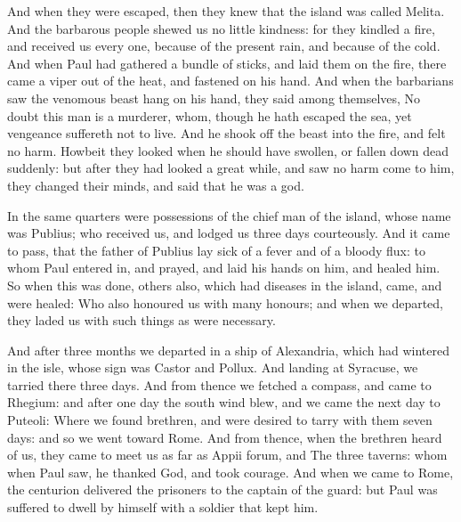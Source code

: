  And when they were escaped, then they knew that the island
was called Melita.  And the barbarous people shewed us no
little kindness: for they kindled a fire, and received us every one,
because of the present rain, and because of the cold.  And
when Paul had gathered a bundle of sticks, and laid them on the fire,
there came a viper out of the heat, and fastened on his hand.
 And when the barbarians saw the venomous beast hang on his
hand, they said among themselves, No doubt this man is a murderer, whom,
though he hath escaped the sea, yet vengeance suffereth not to live.
 And he shook off the beast into the fire, and felt no harm.
 Howbeit they looked when he should have swollen, or fallen
down dead suddenly: but after they had looked a great while, and saw no
harm come to him, they changed their minds, and said that he was a god.

 In the same quarters were possessions of the chief man of
the island, whose name was Publius; who received us, and lodged us three
days courteously.  And it came to pass, that the father of
Publius lay sick of a fever and of a bloody flux: to whom Paul entered
in, and prayed, and laid his hands on him, and healed him. 
So when this was done, others also, which had diseases in the island,
came, and were healed:  Who also honoured us with many
honours; and when we departed, they laded us with such things as were
necessary.

 And after three months we departed in a ship of
Alexandria, which had wintered in the isle, whose sign was Castor and
Pollux.  And landing at Syracuse, we tarried there three
days.  And from thence we fetched a compass, and came to
Rhegium: and after one day the south wind blew, and we came the next day
to Puteoli:  Where we found brethren, and were desired to
tarry with them seven days: and so we went toward Rome. 
And from thence, when the brethren heard of us, they came to meet us as
far as Appii forum, and The three taverns: whom when Paul saw, he
thanked God, and took courage.  And when we came to Rome,
the centurion delivered the prisoners to the captain of the guard: but
Paul was suffered to dwell by himself with a soldier that kept him.

